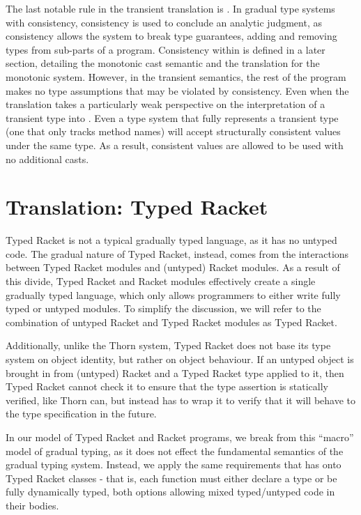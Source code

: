 \documentclass[a4paper,USenglish]{tex/lipics-v2016}
\begin{document}
The last notable rule in the transient translation is . In gradual type systems with consistency, 
consistency is used to conclude an analytic judgment, as consistency allows the system to break type guarantees, adding and removing types from sub-parts of a program.
Consistency within \kafka is defined in a later section, detailing the monotonic cast semantic and the translation for the monotonic system.   
However, in the transient semantics, the rest of the program makes no type assumptions that may be violated by consistency. Even when the 
translation takes a particularly weak perspective on the interpretation of a transient type into \kafka. Even a type system that
fully represents a transient type (one that only tracks  method names) will accept structurally consistent values under the 
same type. As a result, consistent values are allowed to be used with no additional casts.

\section{Translation: Typed Racket}

Typed Racket is not a typical gradually typed language, as it has no untyped
code. The gradual nature of Typed Racket, instead, comes from the interactions
between Typed Racket modules and  (untyped) Racket modules. As a result of this
divide, Typed Racket and Racket modules effectively create a single gradually
typed language, which only allows programmers to either write fully typed or
untyped modules. To simplify the discussion, we will refer to the combination of
untyped Racket and Typed Racket modules as Typed Racket.

Additionally, unlike the Thorn system, Typed Racket does not base its type 
system on object identity, but rather on object behaviour. If an 
untyped object is brought in from (untyped) Racket and a Typed Racket type 
applied to it, then Typed Racket cannot check it to ensure that the type 
assertion is statically verified, like Thorn can, but instead has to wrap
it to verify that it will behave to the type specification in the future.

In our model of Typed Racket and Racket programs, we break from this ``macro''
model of gradual typing, as it does not effect the fundamental semantics of the
gradual typing system. Instead, we apply the same requirements that \kafka has
onto Typed Racket classes - that is, each function must either declare a type
or be fully dynamically typed, both options allowing mixed typed/untyped code
in their bodies.
\end{document}
